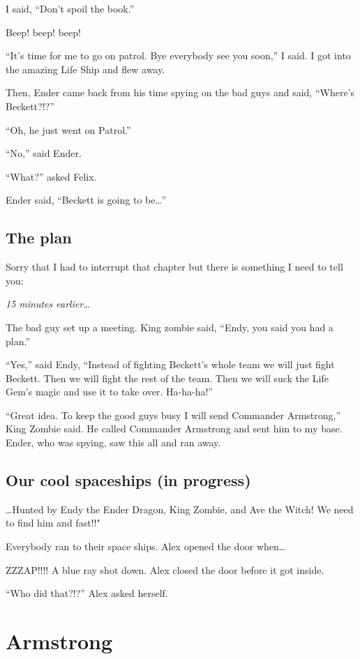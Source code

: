 \documentclass[booklet, twoside, 12pt]{krantz}
\begin{document}
I said, ``Don't spoil the book.''

Beep! beep! beep!

``It's time for me to go on patrol. Bye everybody see you soon,'' I
said. I got into the amazing Life Ship and flew away.

Then, Ender came back from his time spying on the bad guys and said,
``Where's Beckett?!?''

``Oh, he just went on Patrol.''

``No,'' said Ender.

``What?'' asked Felix.

Ender said, ``Beckett is going to be\ldots{}''

\hypertarget{the-plan}{%
\subsection{The plan}\label{the-plan}}

Sorry that I had to interrupt that chapter but there is something I need
to tell you:

\emph{15 minutes earlier\ldots{}}

The bad guy set up a meeting. King zombie said, ``Endy, you said you had
a plan.''

``Yes,'' said Endy, ``Instead of fighting Beckett's whole team we will
just fight Beckett. Then we will fight the rest of the team. Then we
will suck the Life Gem's magic and use it to take over. Ha-ha-ha!''

``Great idea. To keep the good guys busy I will send Commander
Armstrong,'' King Zombie said. He called Commander Armstrong and sent
him to my base. Ender, who was spying, saw this all and ran away.

\hypertarget{our-cool-spaceships-in-progress}{%
\subsection{Our cool spaceships (in
progress)}\label{our-cool-spaceships-in-progress}}

\ldots{}Hunted by Endy the Ender Dragon, King Zombie, and Ave the Witch!
We need to find him and fast!!"

Everybody ran to their space ships. Alex opened the door when\ldots{}

ZZZAP!!!! A blue ray shot down. Alex closed the door before it got
inside.

``Who did that?!?'' Alex asked herself.

\hypertarget{armstrong}{%
\section{Armstrong}\label{armstrong}}
\end{document}
